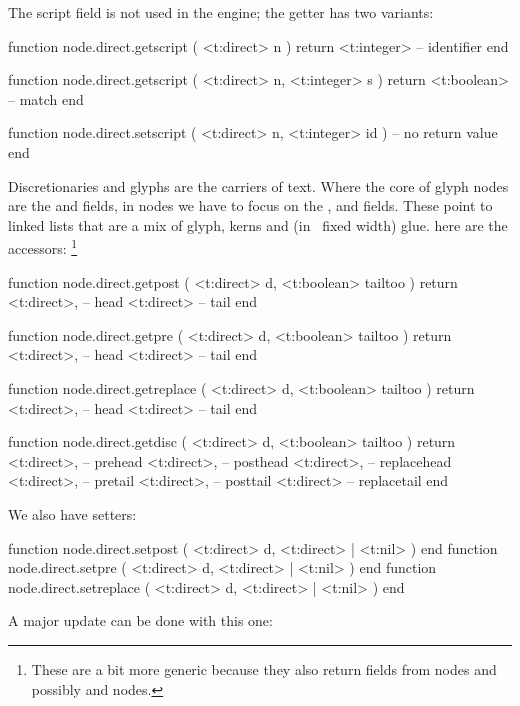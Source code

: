 The script field is not used in the engine; the getter has two variants:

\starttyping[option=LUA]
function node.direct.getscript ( <t:direct> n )
    return <t:integer> -- identifier
end

function node.direct.getscript ( <t:direct> n, <t:integer> s )
    return <t:boolean> -- match
end

function node.direct.setscript (
    <t:direct>  n,
    <t:integer> id
)
    -- no return value
end
\stoptyping

\stopsubsection

\startsubsection[title=Discretionaries]

Discretionaries and glyphs are the carriers of text. Where the core of \type
{glyph} nodes are the  and  fields, in  nodes
we have to focus on the ,  and  fields.
These point to linked lists that are a mix of glyph, kerns and (in \LUAMETATEX\
fixed width) glue. here are the accessors: \footnote {These are a bit more
generic because they also return fields from \type {choice} nodes and possibly
\type {hlist} and \type {vlist} nodes.}

\starttyping[option=LUA]
function node.direct.getpost ( <t:direct> d, <t:boolean> tailtoo )
    return
        <t:direct>, -- head
        <t:direct>  -- tail
end

function node.direct.getpre ( <t:direct> d, <t:boolean> tailtoo )
    return
        <t:direct>, -- head
        <t:direct>  -- tail
end

function node.direct.getreplace ( <t:direct> d, <t:boolean> tailtoo )
    return
        <t:direct>, -- head
        <t:direct>  -- tail
end
\stoptyping

\starttyping[option=LUA]
function node.direct.getdisc ( <t:direct> d, <t:boolean> tailtoo )
    return
        <t:direct>, -- prehead
        <t:direct>, -- posthead
        <t:direct>, -- replacehead
        <t:direct>, -- pretail
        <t:direct>, -- posttail
        <t:direct>  -- replacetail
end
\stoptyping

We also have setters:

\starttyping[option=LUA]
function node.direct.setpost    ( <t:direct> d, <t:direct> | <t:nil> ) end
function node.direct.setpre     ( <t:direct> d, <t:direct> | <t:nil> ) end
function node.direct.setreplace ( <t:direct> d, <t:direct> | <t:nil> ) end
\stoptyping

A major update can be done with this one:

